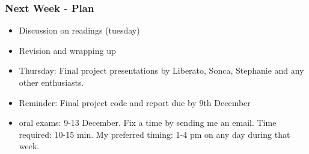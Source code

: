 \documentclass{beamer}
\begin{document}
\begin{frame} %
\frametitle{Next Week - Plan}
\begin{itemize}
\item Discussion on readings (tuesday)
\item Revision and wrapping up
\item Thursday: Final project presentations by Liberato, Sonca, Stephanie and any other enthusiasts. 
\item Reminder: Final project code and report due by 9th December
\item oral exams: 9-13 December. Fix a time by sending me an email. Time required: 10-15 min. My preferred timing: 1-4 pm on any day during that week. 
\end{itemize}
\end{frame}
\end{document}
